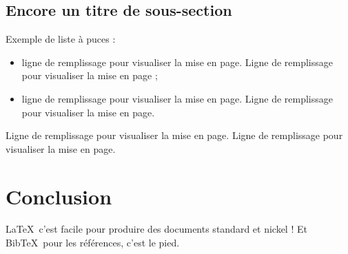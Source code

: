\documentclass[a4paper,11pt]{article}
\begin{document}
\subsection{Encore un titre de sous-section}

Exemple de liste à puces :
\begin{itemize}
        \item ligne de remplissage pour visualiser la mise en page. Ligne de
        remplissage pour visualiser la mise en page ;

        \item ligne de remplissage pour visualiser la mise en page. Ligne de
        remplissage pour visualiser la mise en page.
\end{itemize}

Ligne de remplissage pour visualiser la mise en page. Ligne de remplissage pour
visualiser la mise en page. 


\section{Conclusion} 
 
\LaTeX\ c'est facile pour produire des documents standard et nickel ! 
Et Bib\TeX\ pour les références, c'est le pied.


\end{document}

